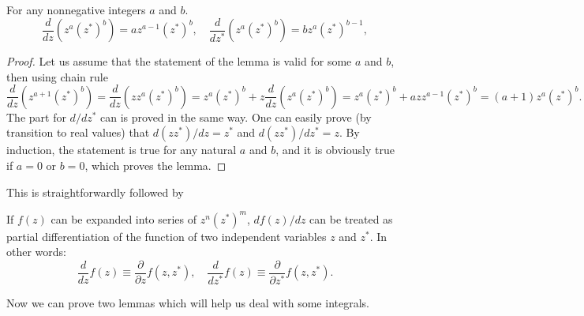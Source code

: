 \begin{lemma}
For any nonnegative integers $a$ and $b$.
\[
	\frac{d}{dz} (z^a (z^*)^b) = a z^{a-1} (z^*)^b,
	\quad
	\frac{d}{dz^*} (z^a (z^*)^b) = b z^a (z^*)^{b-1},
\]
\end{lemma}
\begin{proof}
Let us assume that the statement of the lemma is valid for some $a$ and $b$, then using chain rule
\[
	\frac{d}{dz} (z^{a+1} (z^*)^b)
	= \frac{d}{dz} (z z^a (z^*)^b)
	= z^a (z^*)^b + z \frac{d}{dz} (z^a (z^*)^b)
	= z^a (z^*)^b + a z z^{a-1} (z^*)^b
	= (a + 1) z^a (z^*)^b.
\]
The part for $d/dz^*$ can is proved in the same way.
One can easily prove (by transition to real values) that $d(z z^*)/dz = z^*$ and $d(z z^*)/dz^* = z$.
By induction, the statement is true for any natural $a$ and $b$,
and it is obviously true if $a = 0$ or $b = 0$, which proves the lemma.
\end{proof}

This is straightforwardly followed by
\begin{lemma}
If $f(z)$ can be expanded into series of $z^n (z^*)^m$, $df(z)/dz$ can be treated as partial differentiation of the function of two independent variables $z$ and $z^*$.
In other words:
\[
	\frac{d}{dz} f(z) \equiv \frac{\partial}{\partial z} f(z, z^*),
	\quad
	\frac{d}{dz^*} f(z) \equiv \frac{\partial}{\partial z^*} f(z, z^*).
\]
\end{lemma}

Now we can prove two lemmas which will help us deal with some integrals.

